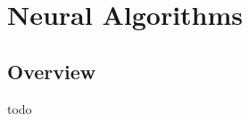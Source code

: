 


\chapter{Neural Algorithms}
\label{ch:neural}

\section{Overview}
todo

\newpage
\newpage
\newpage
\newpage
\newpage

